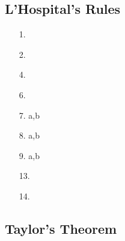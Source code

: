 \documentclass[letter paper, 11pt]{article}
\begin{document}
\subsection{L'Hospital's Rules}

\begin{itemize}
    \item[1.]
    
        
    
    \item[2.]
    
        
    
    \item[4.]
    
        
    
    \item[6.]
    
        
    
    \item[7.] a,b
    
        
    
    \item[8.] a,b
    
        
    
    \item[9.] a,b
    
        
    
    \item[13.]
    
        
    
    \item[14.]
    
        
    
\end{itemize}

\subsection{Taylor's Theorem}
\end{document}
